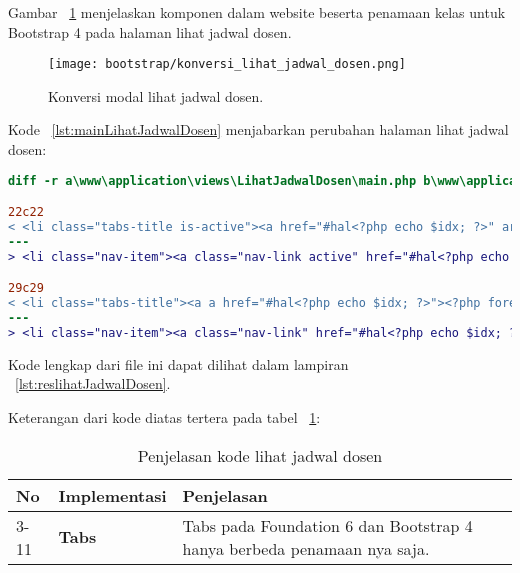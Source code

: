 \noindent Gambar ~\ref{fig:konversiLihatJadwalDosen} menjelaskan komponen dalam website beserta penamaan kelas untuk Bootstrap 4 pada halaman lihat jadwal dosen.\\

\begin{figure} [H]
	\centering  
	\texttt{[image: bootstrap/konversi\_lihat\_jadwal\_dosen.png]}
	\caption{Konversi modal lihat jadwal dosen.}
	\label{fig:konversiLihatJadwalDosen}
\end{figure}
Kode ~\ref{lst:mainLihatJadwalDosen} menjabarkan perubahan halaman lihat jadwal dosen:
\begin{lstlisting}[language=diff, caption=Kode untuk Halaman Lihat Jadwal Dosen,  basicstyle=\ttfamily, frame=single,
columns=fullflexible, keepspaces=true, breaklines=true, label={lst:mainLihatJadwalDosen}]
diff -r a\www\application\views\LihatJadwalDosen\main.php b\www\application\views\LihatJadwalDosen\main.php

22c22
< <li class="tabs-title is-active"><a href="#hal<?php echo $idx; ?>" aria-selected="true"><?php foreach ($currRow as $data) {
---
> <li class="nav-item"><a class="nav-link active" href="#hal<?php echo $idx; ?>" aria-selected="true"><?php foreach ($currRow as $data) {

29c29
< <li class="tabs-title"><a a href="#hal<?php echo $idx; ?>"><?php foreach ($currRow as $data) {
---
> <li class="nav-item"><a class="nav-link" href="#hal<?php echo $idx; ?>"><?php foreach ($currRow as $data) {
\end{lstlisting}
Kode lengkap dari file ini dapat dilihat dalam lampiran ~\ref{lst:reslihatJadwalDosen}.

Keterangan dari kode diatas tertera pada tabel ~\ref{tabel:lihatJadwalDosen}:
\begin{table}[H]
	\centering
	\caption{Penjelasan kode lihat jadwal dosen}
	\begin{tabularx}{\textwidth}{llX}
		\toprule
		No & Implementasi     & Penjelasan \\
		\midrule
		3-11 & \textbf{Tabs}  & Tabs pada Foundation 6 dan Bootstrap 4 hanya berbeda penamaan nya saja.\\
		\bottomrule
	\end{tabularx}%
	\label{tabel:lihatJadwalDosen}
\end{table}

